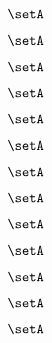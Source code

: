 \begin{forslides}
    \begin{equation}
        \label{eq:slides-translation-13}
        \setA
    \end{equation}

    \begin{equation}
        \label{eq:slides-translation-14}
        \setA
    \end{equation}

    \begin{equation}
        \label{eq:slides-translation-15}
        \setA
    \end{equation}

    \begin{equation}
        \label{eq:slides-translation-16}
        \setA
    \end{equation}

    \begin{equation}
        \label{eq:slides-translation-17}
        \setA
    \end{equation}

    \begin{equation}
        \label{eq:slides-translation-18}
        \setA
    \end{equation}

    \begin{equation}
        \label{eq:slides-translation-19}
        \setA
    \end{equation}
    
    \begin{equation}
        \label{eq:slides-translation-20}
        \setA
    \end{equation}

    \begin{equation}
        \label{eq:slides-translation-21}
        \setA
    \end{equation}

    \begin{equation}
        \label{eq:slides-translation-22}
        \setA
    \end{equation}

    \begin{equation}
        \label{eq:slides-translation-23}
        \setA
    \end{equation}

    \begin{equation}
        \label{eq:slides-translation-24}
        \setA
    \end{equation}

    \begin{equation}
        \label{eq:slides-translation-25}
        \setA
    \end{equation}


\end{forslides}

